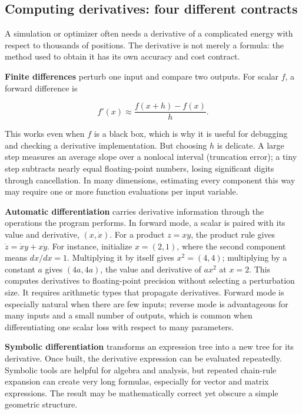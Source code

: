 \subsection{Computing derivatives: four different contracts}\label{04-visual-computing-ii-ch029-computing-derivatives-four-different-contracts}

\hypertarget{04-visual-computing-ii-ch029-computing-derivatives-four-different-contracts}{}

A simulation or optimizer often needs a derivative of a complicated energy with respect to thousands of positions. The derivative is not merely a formula: the method used to obtain it has its own accuracy and cost contract.

\textbf{Finite differences} perturb one input and compare two outputs. For scalar \(f\), a forward difference is

\[
f'(x)\approx\frac{f(x+h)-f(x)}{h}.
\]

This works even when \(f\) is a black box, which is why it is useful for debugging and checking a derivative implementation. But choosing \(h\) is delicate. A large step measures an average slope over a nonlocal interval (truncation error); a tiny step subtracts nearly equal floating-point numbers, losing significant digits through cancellation. In many dimensions, estimating every component this way may require one or more function evaluations per input variable.

\textbf{Automatic differentiation} carries derivative information through the operations the program performs. In forward mode, a scalar is paired with its value and derivative, \((x,\dot x)\). For a product \(z=xy\), the product rule gives \(\dot z=\dot x y+x\dot y\). For instance, initialize \(x=(2,1)\), where the second component means \(dx/dx=1\). Multiplying it by itself gives \(x^2=(4,4)\); multiplying by a constant \(a\) gives \((4a,4a)\), the value and derivative of \(ax^2\) at \(x=2\). This computes derivatives to floating-point precision without selecting a perturbation size. It requires arithmetic types that propagate derivatives. Forward mode is especially natural when there are few inputs; reverse mode is advantageous for many inputs and a small number of outputs, which is common when differentiating one scalar loss with respect to many parameters.

\textbf{Symbolic differentiation} transforms an expression tree into a new tree for its derivative. Once built, the derivative expression can be evaluated repeatedly. Symbolic tools are helpful for algebra and analysis, but repeated chain-rule expansion can create very long formulas, especially for vector and matrix expressions. The result may be mathematically correct yet obscure a simple geometric structure.

